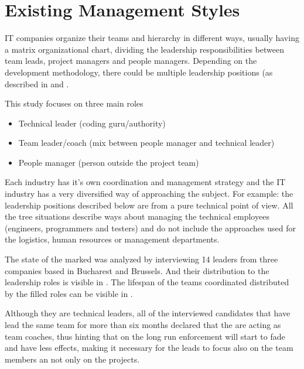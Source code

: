 \chapter{Existing Management Styles}
\label{chapter:existing}
IT companies  organize their teams and hierarchy in different ways, usually having a matrix organizational chart, dividing the leadership responsibilities between team leads, project managers and people managers. Depending on the development methodology, there could be multiple leadership positions (as described in \cite{abur-tl} and \cite{abur-pm}.

This study focuses on three main roles
\begin{itemize}
\item Technical leader (coding guru/authority)
\item Team leader/coach (mix between people manager and technical leader)
\item People manager (person outside the project team)

\end{itemize}
Each industry has it's own coordination and management strategy and the IT industry has a very diversified way of approaching the subject. For example: the leadership positions described below are from a pure technical point of view. All the tree situations describe ways about managing the technical employees (engineers, programmers and testers) and do not include the approaches used for the logistics, human resources or management departments.

The state of the marked was analyzed by interviewing 14 leaders from three companies based in Bucharest and Brussels. And their distribution to the leadership roles is visible in . The lifespan of the teams coordinated distributed by the filled roles can be visible in .

 
Although they are technical leaders, all of the interviewed candidates that have lead the same team for more than six months declared that the are acting as team coaches, thus  hinting that on the long run enforcement will start to fade and have less effects, making it necessary for the leads to focus also on the team members an not only on the projects.

